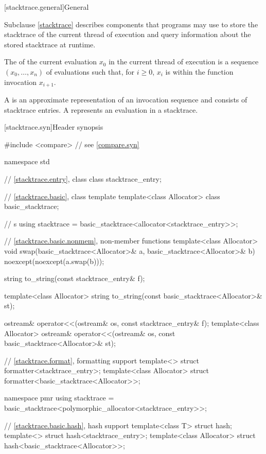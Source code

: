 [stacktrace.general]{General}

\pnum
Subclause \ref{stacktrace} describes components
that \Cpp{} programs may use to store
the stacktrace of the current thread of execution and
query information about the stored stacktrace at runtime.

\pnum
The  of the current evaluation $x_0$
in the current thread of execution
is a sequence $(x_0, \ldots, x_n)$ of evaluations such that, for $i \geq 0$,
$x_i$ is within the function invocation $x_{i+1}$.

\pnum
A  is an approximate representation of
an invocation sequence and consists of stacktrace entries.
A  represents an evaluation in a stacktrace.

[stacktrace.syn]{Header  synopsis}

%
\begin{codeblock}
#include <compare>              // see \ref{compare.syn}

namespace std {
  // \ref{stacktrace.entry}, class 
  class stacktrace_entry;

  // \ref{stacktrace.basic}, class template 
  template<class Allocator>
    class basic_stacktrace;

  //  s
  using stacktrace = basic_stacktrace<allocator<stacktrace_entry>>;

  // \ref{stacktrace.basic.nonmem}, non-member functions
  template<class Allocator>
    void swap(basic_stacktrace<Allocator>& a, basic_stacktrace<Allocator>& b)
      noexcept(noexcept(a.swap(b)));

  string to_string(const stacktrace_entry& f);

  template<class Allocator>
    string to_string(const basic_stacktrace<Allocator>& st);

  ostream& operator<<(ostream& os, const stacktrace_entry& f);
  template<class Allocator>
    ostream& operator<<(ostream& os, const basic_stacktrace<Allocator>& st);

  // \ref{stacktrace.format}, formatting support
  template<> struct formatter<stacktrace_entry>;
  template<class Allocator> struct formatter<basic_stacktrace<Allocator>>;

  namespace pmr {
    using stacktrace = basic_stacktrace<polymorphic_allocator<stacktrace_entry>>;
  }

  // \ref{stacktrace.basic.hash}, hash support
  template<class T> struct hash;
  template<> struct hash<stacktrace_entry>;
  template<class Allocator> struct hash<basic_stacktrace<Allocator>>;
}
\end{codeblock}

